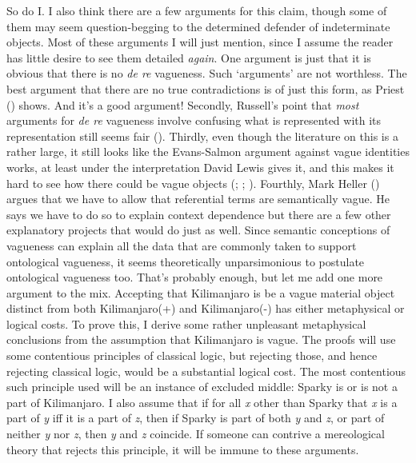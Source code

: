 \documentclass[
  11pt,
  letterpaper,
  DIV=11,
  numbers=noendperiod,
  oneside]{scrartcl}
\begin{document}
So do I. I also think there are a few arguments for this claim, though
some of them may seem question-begging to the determined defender of
indeterminate objects. Most of these arguments I will just mention,
since I assume the reader has little desire to see them detailed
\emph{again}. One argument is just that it is obvious that there is no
\emph{de re} vagueness. Such `arguments' are not worthless. The best
argument that there are no true contradictions is of just this form, as
Priest () shows. And it's a good
argument! Secondly, Russell's point that \emph{most} arguments for
\emph{de re} vagueness involve confusing what is represented with its
representation still seems fair (). Thirdly, even though the literature on this is a rather large,
it still looks like the Evans-Salmon argument against vague identities
works, at least under the interpretation David Lewis gives it, and this
makes it hard to see how there could be vague objects
(; ; ). Fourthly, Mark Heller
() argues that we have to allow that
referential terms are semantically vague. He says we have to do so to
explain context dependence but there are a few other explanatory
projects that would do just as well. Since semantic conceptions of
vagueness can explain all the data that are commonly taken to support
ontological vagueness, it seems theoretically unparsimonious to
postulate ontological vagueness too. That's probably enough, but let me
add one more argument to the mix. Accepting that Kilimanjaro is be a
vague material object distinct from both Kilimanjaro(+) and
Kilimanjaro(-) has either metaphysical or logical costs. To prove this,
I derive some rather unpleasant metaphysical conclusions from the
assumption that Kilimanjaro is vague. The proofs will use some
contentious principles of classical logic, but rejecting those, and
hence rejecting classical logic, would be a substantial logical cost.
The most contentious such principle used will be an instance of excluded
middle: Sparky is or is not a part of Kilimanjaro. I also assume that if
for all \emph{x} other than Sparky that \emph{x} is a part of \emph{y}
iff it is a part of \emph{z}, then if Sparky is part of both \emph{y}
and \emph{z}, or part of neither \emph{y} nor \emph{z}, then \emph{y}
and \emph{z} coincide. If someone can contrive a mereological theory
that rejects this principle, it will be immune to these arguments.
\end{document}
